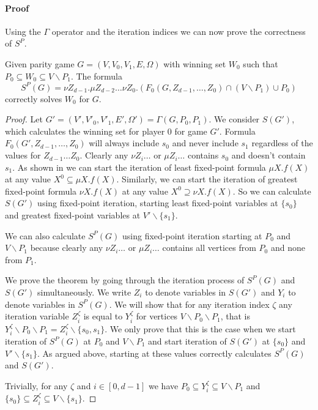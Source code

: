 \paragraph{Proof}
Using the $\Gamma$ operator and the iteration indices we can now prove the correctness of $S^P$.
\begin{theorem}
	\label{the_formula_cupP0_etc_is_correct}
	Given parity game $G = (V,V_0,V_1,E,\Omega)$ with winning set $W_0$ such that $P_0\subseteq W_0 \subseteq V\backslash P_1$. The formula 
	\[ S^P(G) = \nu Z_{d-1}.\mu Z_{d-2}\dots \nu Z_0.(F_0(G,Z_{d-1},\dots,Z_0) \cap (V\backslash P_1) \cup P_0) \]
	correctly solves $W_0$ for $G$.
	\begin{proof}
		Let $G' = (V',V'_0,V'_1,E',\Omega') = \Gamma(G,P_0,P_1)$. We consider $S(G')$, which calculates the winning set for player $0$ for game $G'$. Formula $F_0(G',Z_{d-1},\dots,Z_0)$ will always include $s_0$ and never include $s_1$ regardless of the values for $Z_{d-1} \dots Z_0$. Clearly any $\nu Z_i\dots$ or $\mu Z_i\dots$ contains $s_0$ and doesn't contain $s_1$. As shown in \cite{Emerson:1986:MCP:900378} we can start the iteration of least fixed-point formula $\mu X.f(X)$ at any value $X^0 \subseteq \mu  X.f(X)$. Similarly, we can start the iteration of greatest fixed-point formula $\nu X.f(X)$ at any value $X^0 \supseteq \nu X.f(X)$. So we can calculate $S(G')$ using fixed-point iteration, starting least fixed-point variables at $\{s_0\}$ and greatest fixed-point variables at $V'\backslash \{s_1\}$.
		
		We can also calculate $S^P(G)$ using fixed-point iteration starting at $P_0$ and $V\backslash P_1$ because clearly any $\nu Z_i \dots$ or $\mu Z_i\dots$ contains all vertices from $P_0$ and none from $P_1$.
		
		We prove the theorem by going through the iteration process of $S^P(G)$ and $S(G')$ simultaneously. We write $Z_i$ to denote variables in $S(G')$ and $Y_i$ to denote variables in $S^P(G)$. We will show that for any iteration index $\zeta$ any iteration variable $Z_i^\zeta$ is equal to $Y_i^\zeta$ for vertices $V\backslash P_0 \backslash P_1$, that is $Y_i^\zeta\backslash P_0 \backslash P_1 = Z_i^\zeta \backslash \{s_0,s_1\}$. We only prove that this is the case when we start iteration of $ S^P(G)$ at $P_0$ and $V\backslash P_1$ and start iteration of $S(G')$ at $\{s_0\}$ and $V'\backslash \{s_1\}$. As argued above, starting at these values correctly calculates $S^P(G)$ and $S(G')$.
		
		Trivially, for any $\zeta$ and $i \in [0,d-1]$ we have $P_0 \subseteq Y_i^{\zeta} \subseteq V\backslash P_1$ and $\{s_0\} \subseteq Z_i^\zeta\subseteq V\backslash \{s_1\}$.
		

\end{proof}
\end{theorem}
